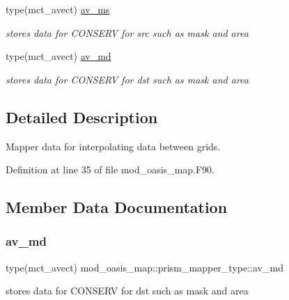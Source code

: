 \begin{DoxyCompactItemize}
type(mct\+\_\+avect) \hyperlink{structmod__oasis__map_1_1prism__mapper__type_a428a70b5f90d592638e1eaf55c56baae}{av\+\_\+ms}
\begin{DoxyCompactList}\small\item\em stores data for C\+O\+N\+S\+E\+RV for src such as mask and area \end{DoxyCompactList}\item 
type(mct\+\_\+avect) \hyperlink{structmod__oasis__map_1_1prism__mapper__type_a3ff54ff3819cd06df5d6a9f9d993cb21}{av\+\_\+md}
\begin{DoxyCompactList}\small\item\em stores data for C\+O\+N\+S\+E\+RV for dst such as mask and area \end{DoxyCompactList}\end{DoxyCompactItemize}


\subsection{Detailed Description}
Mapper data for interpolating data between grids. 

Definition at line 35 of file mod\+\_\+oasis\+\_\+map.\+F90.



\subsection{Member Data Documentation}
\mbox{\label{structmod__oasis__map_1_1prism__mapper__type_a3ff54ff3819cd06df5d6a9f9d993cb21}} 
\subsubsection{\texorpdfstring{av\+\_\+md}{av\_md}}
{\footnotesize\ttfamily type(mct\+\_\+avect) mod\+\_\+oasis\+\_\+map\+::prism\+\_\+mapper\+\_\+type\+::av\+\_\+md\hspace{0.3cm}{\ttfamily [private]}}



stores data for C\+O\+N\+S\+E\+RV for dst such as mask and area 



